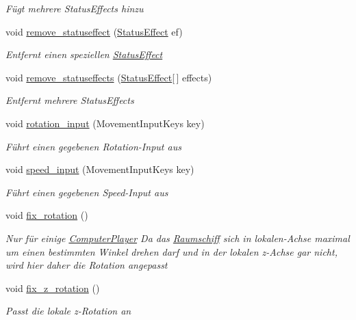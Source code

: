 \begin{DoxyCompactItemize}
\begin{DoxyCompactList}\small\item\em Fügt mehrere Status\+Effects hinzu \end{DoxyCompactList}\item 
void \hyperlink{class_spaceship_acc4b097a3bfdc0cbefe00246dbbcb534}{remove\+\_\+statuseffect} (\hyperlink{class_status_effect}{Status\+Effect} ef)
\begin{DoxyCompactList}\small\item\em Entfernt einen speziellen \hyperlink{class_status_effect}{Status\+Effect} \end{DoxyCompactList}\item 
void \hyperlink{class_spaceship_aa022b21fc3d102181d347b1bc1e81cba}{remove\+\_\+statuseffects} (\hyperlink{class_status_effect}{Status\+Effect}\mbox{[}$\,$\mbox{]} effects)
\begin{DoxyCompactList}\small\item\em Entfernt mehrere Status\+Effects \end{DoxyCompactList}\item 
void \hyperlink{class_spaceship_accc7fe7a6f5df4f43fa8b3ab7469c3c7}{rotation\+\_\+input} (Movement\+Input\+Keys key)
\begin{DoxyCompactList}\small\item\em Führt einen gegebenen Rotation-\/\+Input aus \end{DoxyCompactList}\item 
void \hyperlink{class_spaceship_a5c0e06422ea1860e18dce8171a585676}{speed\+\_\+input} (Movement\+Input\+Keys key)
\begin{DoxyCompactList}\small\item\em Führt einen gegebenen Speed-\/\+Input aus \end{DoxyCompactList}\item 
void \hyperlink{class_spaceship_afd788bbc8497cb88acb1c4633a3b1bb3}{fix\+\_\+rotation} ()
\begin{DoxyCompactList}\small\item\em Nur für einige \hyperlink{class_computer_player}{Computer\+Player} Da das \hyperlink{class_raumschiff}{Raumschiff} sich in lokalen-\/\+Achse maximal um einen bestimmten Winkel drehen darf und in der lokalen z-\/\+Achse gar nicht, wird hier daher die Rotation angepasst \end{DoxyCompactList}\item 
void \hyperlink{class_spaceship_ae5251fec3b08bf9b4e34e2e854e27e9f}{fix\+\_\+z\+\_\+rotation} ()
\begin{DoxyCompactList}\small\item\em Passt die lokale z-\/\+Rotation an \end{DoxyCompactList}\item 

\end{DoxyCompactItemize}
